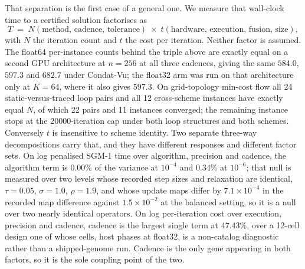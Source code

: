 That separation is the first case of a general one. We measure that wall-clock
time to a certified solution factorises as
\begin{equation}
T \;=\; N(\text{method},\, \text{cadence},\, \text{tolerance}) \;\times\;
        t(\text{hardware},\, \text{execution},\, \text{fusion},\, \text{size}),
\label{eq:factorisation}
\end{equation}
with $N$ the iteration count and $t$ the cost per iteration. Neither factor is
assumed. The float64 per-instance counts behind the triple above are exactly
equal on a second GPU architecture at $n=256$ at all three cadences, giving the
same $584.0$, $597.3$ and $682.7$ under Condat-Vu; the float32 arm was run on
that architecture only at $K=64$, where it also gives $597.3$.
On grid-topology min-cost flow all 24 static-versus-traced loop pairs and all
12 cross-scheme instances have exactly equal $N$, of which 22 pairs and 11
instances converged; the remaining instance stops at the 20000-iteration cap
under both loop structures and both schemes.
Conversely $t$ is insensitive to scheme identity. Two separate three-way
decompositions carry that, and they have different responses and different
factor sets. On log penalised SGM-1 time over algorithm, precision and cadence,
the algorithm term is $0.00\%$ of the variance at $10^{-4}$ and $0.34\%$ at
$10^{-6}$; that null is measured over two levels whose recorded step sizes and
relaxation are identical, $\tau=0.05$, $\sigma=1.0$, $\rho=1.9$, and whose
update maps differ by $7.1\times 10^{-4}$ in the recorded map difference
against $1.5\times 10^{-2}$ at the balanced setting, so it is a null over two
nearly identical operators. On log per-iteration cost over execution, precision
and cadence, cadence is the largest single term at $47.43\%$, over a 12-cell
design one of whose cells, host phases at float32, is a non-catalog diagnostic
rather than a shipped-genome run.
Cadence is the only gene appearing in both factors, so it is the sole coupling
point of the two.

